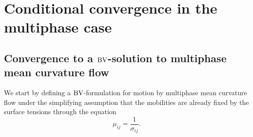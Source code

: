 \section{Conditional convergence in the multiphase case}

\subsection{Convergence to a $\operatorname{BV}$-solution to multiphase mean curvature flow}

We start by defining a $ \operatorname{BV} $-formulation for motion by multiphase mean 
curvature flow under the simplifying assumption that the mobilities are already 
fixed by the surface tensions through the equation
\begin{equation}
	\label{mobilites_inverse_of_surface_tensions}
	\mu_{ i j } =\frac{ 1 }{ \sigma_{ i j } }. 
\end{equation}

